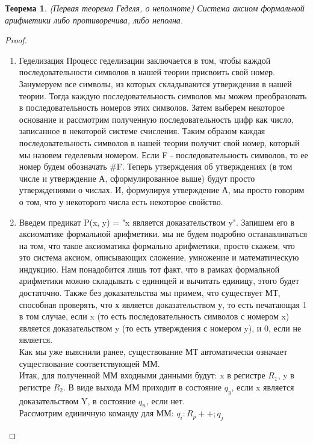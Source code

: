 \documentclass[a4paper]{article}
\newtheorem{theorem} {Теорема}
\begin{document}
{\begin{theorem}(Первая теорема Геделя, о неполноте) Система аксиом формальной арифметики либо противоречива, либо неполна.
\end{theorem}
\begin{proof}
\begin{enumerate}
\item Геделизация
\newline Процесс геделизации заключается в том, чтобы каждой последовательности символов в нашей теории присвоить свой номер. Занумеруем все символы, из которых складываются утверждения в нашей теории. Тогда каждую последовательность символов мы можем преобразовать в последовательность номеров этих символов. Затем выберем некоторое основание и рассмотрим полученную последовательность цифр как число, записанное в некоторой системе счисления. Таким образом каждая последовательность символов в нашей теории получит свой номер, который мы назовем геделевым номером.
\newline Если F - последовательность символов, то ее номер будем обозначать \#F. Теперь утверждения об утверждениях (в том числе и утверждение А, сформулированное выше) будут просто утверждениями о числах. И, формулируя утверждение А, мы просто говорим о том, что у некоторого числа есть некоторое свойство. 
\item Введем предикат P(x, y) = "x является доказательством y". Запишем его в аксиоматике формальной арифметики. 
 мы не будем подробно останавливаться на том, что такое аксиоматика формально арифметики, просто скажем, что это система аксиом, описывающих сложение, умножение и математическую индукцию. Нам понадобится лишь тот факт, что в рамках формальной арифметики можно складывать с единицей и вычитать единицу, этого будет достаточно.
Также без доказательства мы примем, что существует МТ, способная проверять, что х является доказательством у, то есть печатающая 1 в том случае, если x (то есть последовательность символов с номером x) является доказательством y (то есть утверждения с номером y), и 0, если не является. 
\\Как мы уже выяснили ранее, существование МТ автоматически означает существование соответствующей ММ. 
\\Итак, для полученной ММ входными данными будут: x в регистре $R_1$, y в регистре $R_2$. В виде выхода ММ приходит в состояние $q_y$, если x является доказательством Y, в состояние $q_n$, если нет. 
\\Рассмотрим единичную команду для ММ:
\newline $q_i: R_p++; q_j$

\end{enumerate}
\end{proof}}
\end{document}
